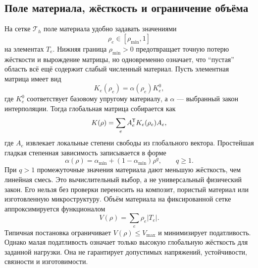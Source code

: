 \subsection{Поле материала, жёсткость и ограничение объёма}
На сетке $\mathcal T_h$ поле материала удобно задавать значениями
\[
 \rho_e\in[\rho_{\min},1]
\]
на элементах $T_e$. Нижняя граница $\rho_{\min}>0$ предотвращает точную потерю жёсткости и вырождение матрицы, но одновременно означает, что ``пустая'' область всё ещё содержит слабый численный материал.
Пусть элементная матрица имеет вид
\begin{equation}
\label{eq:density-element-stiffness-v06}
 K_e(\rho_e)=\alpha(\rho_e)K_e^0,
\end{equation}
где $K_e^0$ соответствует базовому упругому материалу, а $\alpha$ --- выбранный закон интерполяции. Тогда глобальная матрица собирается как
\begin{equation}
\label{eq:density-global-stiffness-v06}
 K(\rho)=\sum_e A_e^{\mathsf{T}}K_e(\rho_e)A_e,
\end{equation}
где $A_e$ извлекает локальные степени свободы из глобального вектора.
Простейшая гладкая степенная зависимость записывается в форме
\begin{equation}
\label{eq:power-material-interpolation-v06}
 \alpha(\rho)
 =\alpha_{\min}
 +(1-\alpha_{\min})\rho^q,
 \qquad q\ge1.
\end{equation}
При $q>1$ промежуточные значения материала дают меньшую жёсткость, чем линейная смесь. Это вычислительный выбор, а не универсальный физический закон. Его нельзя без проверки переносить на композит, пористый материал или изготовленную микроструктуру.
Объём материала на фиксированной сетке аппроксимируется функционалом
\begin{equation}
\label{eq:discrete-material-volume-v06}
 V(\rho)=\sum_e \rho_e|T_e|.
\end{equation}
Типичная постановка ограничивает $V(\rho)\le V_{\max}$ и минимизирует податливость. Однако малая податливость означает только высокую глобальную жёсткость для заданной нагрузки. Она не гарантирует допустимых напряжений, устойчивости, связности и изготовимости.
